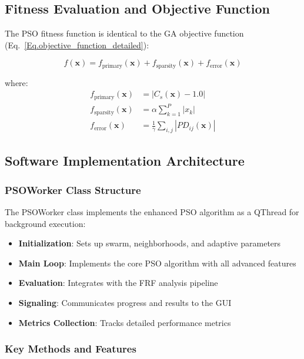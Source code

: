 \documentclass[12pt,a4paper]{article}
\begin{document}
\subsection{Fitness Evaluation and Objective Function}

The PSO fitness function is identical to the GA objective function (Eq.~\eqref{Eq.objective_function_detailed}):

\begin{equation}
f(\mathbf{x}) = f_{\text{primary}}(\mathbf{x}) + f_{\text{sparsity}}(\mathbf{x}) + f_{\text{error}}(\mathbf{x}) \label{eq:pso_fitness}
\end{equation}

where:
\begin{align}
f_{\text{primary}}(\mathbf{x}) &= |C_s(\mathbf{x}) - 1.0| \label{eq:pso_primary} \\
f_{\text{sparsity}}(\mathbf{x}) &= \alpha \sum_{k=1}^{P} |x_k| \label{eq:pso_sparsity} \\
f_{\text{error}}(\mathbf{x}) &= \frac{1}{\gamma} \sum_{i,j} |PD_{ij}(\mathbf{x})| \label{eq:pso_error}
\end{align}

\subsection{Software Implementation Architecture}

\subsubsection{PSOWorker Class Structure}

The PSOWorker class implements the enhanced PSO algorithm as a QThread for background execution:

\begin{itemize}
    \item \textbf{Initialization}: Sets up swarm, neighborhoods, and adaptive parameters
    \item \textbf{Main Loop}: Implements the core PSO algorithm with all advanced features
    \item \textbf{Evaluation}: Integrates with the FRF analysis pipeline
    \item \textbf{Signaling}: Communicates progress and results to the GUI
    \item \textbf{Metrics Collection}: Tracks detailed performance metrics
\end{itemize}

\subsubsection{Key Methods and Features}
\end{document}
